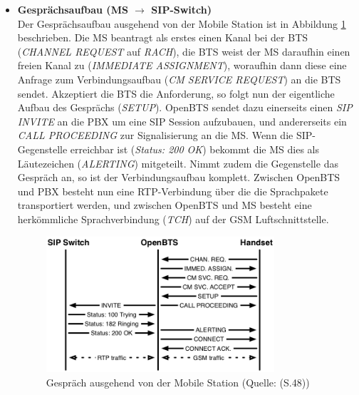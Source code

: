 \begin{itemize}
\item \textbf{Gesprächsaufbau (MS $\rightarrow$ SIP-Switch)}\\
Der Gesprächsaufbau ausgehend von der Mobile Station ist in Abbildung \ref{fig:openbts_call_msside} beschrieben. Die MS beantragt als erstes einen Kanal bei der BTS (\textit{CHANNEL REQUEST} auf \textit{RACH}), die BTS weist der MS daraufhin einen freien Kanal zu (\textit{IMMEDIATE ASSIGNMENT}), woraufhin dann diese eine Anfrage zum Verbindungsaufbau (\textit{CM SERVICE REQUEST}) an die BTS sendet. Akzeptiert die BTS die Anforderung, so folgt nun der eigentliche Aufbau des Gesprächs (\textit{SETUP}). OpenBTS sendet dazu einerseits einen \textit{SIP INVITE} an die PBX um eine SIP Session aufzubauen, und andererseits ein \textit{CALL PROCEEDING} zur Signalisierung an die MS. Wenn die SIP-Gegenstelle erreichbar ist (\textit{Status: 200 OK}) bekommt die MS dies als Läutezeichen (\textit{ALERTING}) mitgeteilt. Nimmt zudem die Gegenstelle das Gespräch an, so ist der Verbindungsaufbau komplett. Zwischen OpenBTS und PBX besteht nun eine RTP-Verbindung über die die Sprachpakete transportiert werden, und zwischen OpenBTS und MS besteht eine herkömmliche Sprachverbindung (\textit{TCH}) auf der GSM Luftschnittstelle.
\begin{figure}[h]
	\centering
		\includegraphics[width=0.80\textwidth]{img/openbts_call_msside.png}
	\caption{Gespräch ausgehend von der Mobile Station (Quelle: \cite{bib:openbtsmanual}(S.48))}
	\label{fig:openbts_call_msside}
\end{figure}
\end{itemize}
